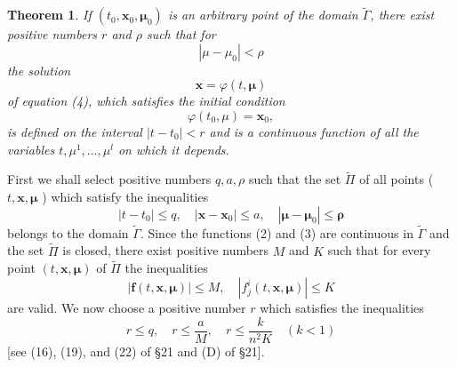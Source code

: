 \documentclass[10pt,a5paper]{book}
\makeatletter
\theoremstyle{plain}
\newtheorem{theorem}{Theorem}
\theoremstyle{definition}
\theoremstyle{remark}
\renewenvironment{proof}[1][\proofname]{\par
  \pushQED{\qed}%
  \normalfont\topsep6\p@\@plus6\p@\relax
  \trivlist
  \item\relax{\itshape #1\@addpunct{.}}\hspace\labelsep\ignorespaces
}{\popQED\endtrivlist\@endpefalse}
\makeatother
\begin{document}
\begin{theorem}
If $\left(t_{0}, \mathbf{x}_{0}, \boldsymbol{\mu}_{0}\right)$ is an arbitrary point of the domain $\tilde{\Gamma}$, there exist positive numbers $r$ and $\rho$ such that for
\[
\left|\mu-\mu_{0}\right|<\rho
\]
the solution
\[
\mathbf{x}=\varphi(t, \boldsymbol{\mu})
\]
of equation (4), which satisfies the initial condition
\begin{equation*}
\varphi\left(t_{0}, \mu\right)=\mathbf{x}_{0}, \tag{5}
\end{equation*}
is defined on the interval $\left|t-t_{0}\right|<r$ and is a continuous function of all the variables $t, \mu^{1}, \ldots, \mu^{l}$ on which it depends.
\end{theorem}

\begin{proof}
First we shall select positive numbers $q, a, \rho$ such that the set $\widetilde{\Pi}$ of all points ( $t, \mathbf{x}, \boldsymbol{\mu}$ ) which satisfy the inequalities
\begin{equation*}
\left|t-t_{0}\right| \leq q, \quad\left|\mathbf{x}-\mathbf{x}_{0}\right| \leq a, \quad\left|\boldsymbol{\mu}-\boldsymbol{\mu}_{0}\right| \leq \boldsymbol{\rho} \tag{6}
\end{equation*}
belongs to the domain $\widetilde{\Gamma}$. Since the functions (2) and (3) are continuous in $\widetilde{\Gamma}$ and the set $\widetilde{\Pi}$ is closed, there exist positive numbers $M$ and $K$ such that for every point $(t, \mathbf{x}, \boldsymbol{\mu})$ of $\widetilde{\Pi}$ the inequalities
\[
|\mathbf{f}(t, \mathbf{x}, \boldsymbol{\mu})| \leq M, \quad\left|f_{j}^{i}(t, \mathbf{x}, \boldsymbol{\mu})\right| \leq K
\]
are valid. We now choose a positive number $r$ which satisfies the inequalities
\[
r \leq q, \quad r \leq \frac{a}{M}, \quad r \leq \frac{k}{n^{2} K} \quad(k<1)
\]
[see (16), (19), and (22) of §21 and (D) of §21].


\end{proof}
\end{document}
